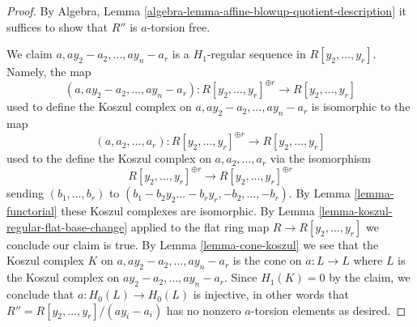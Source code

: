 \documentclass[10pt,a4paper]{amsart}
\theoremstyle{plain}
\theoremstyle{definition}
\theoremstyle{remark}
\numberwithin{equation}{subsection}
\begin{document}
\begin{proof}
By Algebra, Lemma \ref{algebra-lemma-affine-blowup-quotient-description}
it suffices to show that $R''$ is $a$-torsion free.

\medskip\noindent
We claim $a, ay_2 - a_2, \ldots, ay_n - a_r$ is a $H_1$-regular
sequence in $R[y_2, \ldots, y_r]$. Namely, the map
$$
(a, ay_2 - a_2, \ldots, ay_n - a_r) :
R[y_2, \ldots, y_r]^{\oplus r}
\longrightarrow
R[y_2, \ldots, y_r]
$$
used to define the Koszul complex on $a, ay_2 - a_2, \ldots, ay_n - a_r$
is isomorphic to the map
$$
(a, a_2, \ldots, a_r) :
R[y_2, \ldots, y_r]^{\oplus r} \longrightarrow
R[y_2, \ldots, y_r]
$$
used to the define the Koszul complex on $a, a_2, \ldots, a_r$
via the isomorphism
$$
R[y_2, \ldots, y_r]^{\oplus r}
\longrightarrow
R[y_2, \ldots, y_r]^{\oplus r}
$$
sending $(b_1, \ldots, b_r)$ to
$(b_1 - b_2y_2 \ldots - b_ry_r, -b_2, \ldots, - b_r)$.
By Lemma \ref{lemma-functorial} these Koszul complexes are isomorphic.
By Lemma \ref{lemma-koszul-regular-flat-base-change}
applied to the flat ring map $R \to R[y_2, \ldots, y_r]$
we conclude our claim is true. By Lemma \ref{lemma-cone-koszul}
we see that the Koszul complex $K$ on $a, ay_2 - a_2, \ldots, ay_n - a_r$
is the cone on $a : L \to L$ where $L$ is the Koszul complex
on $ay_2 - a_2, \ldots, ay_n - a_r$. Since $H_1(K) = 0$ by the claim,
we conclude that $a : H_0(L) \to H_0(L)$ is injective, in other words that
$R'' = R[y_2, \ldots, y_r]/(a y_i - a_i)$
has no nonzero $a$-torsion elements as desired.
\end{proof}
\end{document}
